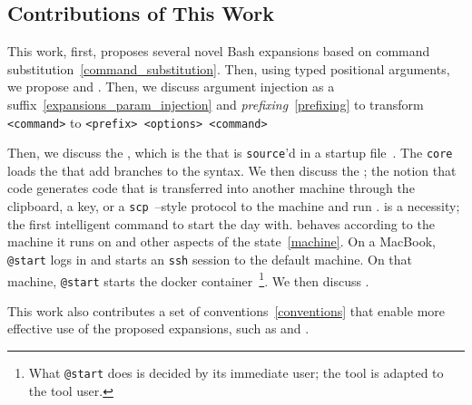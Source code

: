 \subsection{Contributions of This Work}\label{contributions}

This work, first, proposes several novel Bash expansions based on command substitution~\ref{command_substitution}. Then, using typed positional arguments, we propose  and . Then, we discuss argument injection as a suffix~\ref{expansions_param_injection} and \emph{prefixing}~\ref{prefixing} to transform \texttt{<command>} to \texttt{<prefix> <options> <command>}

Then, we discuss the , which is the \kCallable that is \texttt{source}'d in a startup file~\cite{bash_startup_files}. The \texttt{core} loads the  that add branches to the syntax. We then discuss the \kSeed; the notion that code generates code that is transferred into another machine through the clipboard, a key, or a \texttt{scp}~\cite{scp}--style protocol to  the machine and run . \kStart is a necessity; the first intelligent command to start the day with. \kStart behaves according to the machine it runs on and other aspects of the state~\ref{machine}. On a MacBook, \texttt{@start} logs in and starts an \texttt{ssh} session to the default machine. On that machine, \texttt{@start} starts the docker container~\footnote{What \texttt{@start} does is decided by its immediate user; the tool is adapted to the tool user.}. We then discuss \kGit.

This work also contributes a set of conventions~\ref{conventions} that enable more effective use of the proposed expansions, such as  and .